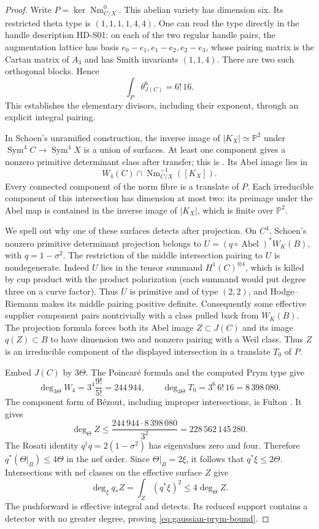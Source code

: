 \begin{proof}
Write $P=\ker\operatorname{Nm}_{C/X}^0$. This abelian variety has dimension six. Its restricted theta type is $(1,1,1,1,4,4)$. One can read the type directly in the handle description HD-S01: on each of the two regular handle pairs, the augmentation lattice has basis $e_0-e_1,e_1-e_2,e_2-e_3$, whose pairing matrix is the Cartan matrix of $A_3$ and has Smith invariants $(1,1,4)$. There are two such orthogonal blocks. Hence
\[
 \int_P\theta_{J(C)}^6=6!\,16.
\]
This establishes the elementary divisors, including their exponent, through an explicit integral pairing.

In Schoen's unramified construction, the inverse image of $|K_X|\simeq\mathbb P^2$ under $\operatorname{Sym}^4C\to\operatorname{Sym}^4X$ is a union of surfaces. At least one component gives a nonzero primitive determinant class after transfer; this is \cite[Theorem~2.0, the $r=0$ construction on pp.~12--13, and Corollary~3.1]{Schoen88}. Its Abel image lies in
\[
 W_4(C)\cap\operatorname{Nm}_{C/X}^{-1}([K_X]).
\]
Every connected component of the norm fibre is a translate of $P$. Each irreducible component of this intersection has dimension at most two: its preimage under the Abel map is contained in the inverse image of $|K_X|$, which is finite over $\mathbb P^2$.

We spell out why one of these surfaces detects after projection. On $C^4$, Schoen's nonzero primitive determinant projection belongs to
$U=(q\circ\operatorname{Abel})^*W_K(B)$, with $q=1-\sigma^2$. The restriction of the middle intersection pairing to $U$ is nondegenerate. Indeed $U$ lies in the tensor summand $H^1(C)^{\otimes4}$, which is killed by cup product with the product polarization (each summand would put degree three on a curve factor). Thus $U$ is primitive and of type $(2,2)$, and Hodge--Riemann makes its middle pairing positive definite. Consequently some effective supplier component pairs nontrivially with a class pulled back from $W_K(B)$. The projection formula forces both its Abel image $Z\subset J(C)$ and its image $q(Z)\subset B$ to have dimension two and nonzero pairing with a Weil class. Thus $Z$ is an irreducible component of the displayed intersection in a translate $T_0$ of $P$.

Embed $J(C)$ by $3\Theta$. The Poincar\'e formula and the computed Prym type give
\[
 \deg_{3\Theta}W_4=3^4\frac{9!}{5!}=244\,944,
 \qquad
 \deg_{3\Theta}T_0=3^6\,6!\,16=8\,398\,080.
\]
The component form of B\'ezout, including improper intersections, is Fulton \cite[Example~8.4.6]{Fulton98}. It gives
\[
 \deg_\Theta Z\le\frac{244\,944\cdot8\,398\,080}{3^2}
       =228\,562\,145\,280.
\]
The Rosati identity $q^\dagger q=2(1-\sigma^2)$ has eigenvalues zero and four. Therefore $q^*(\Theta|_B)\le4\Theta$ in the nef order. Since $\Theta|_B=2\xi$, it follows that $q^*\xi\le2\Theta$. Intersections with nef classes on the effective surface $Z$ give
\[
 \deg_\xi q_*Z=\int_Z(q^*\xi)^2\le4\deg_\Theta Z.
\]
The pushforward is effective integral and detects. Its reduced support contains a detector with no greater degree, proving \eqref{eq:gaussian-prym-bound}.
\end{proof}

